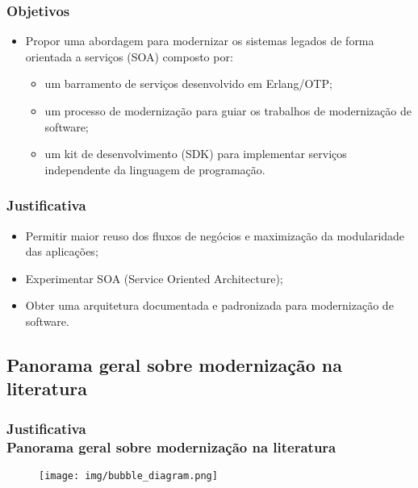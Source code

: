 \documentclass{beamer}
\begin{document}
\begin{frame}
  \frametitle{Objetivos}
  
    \begin{itemize}
       \item<1-> Propor uma abordagem para modernizar os sistemas legados de
forma orientada a serviços (SOA) composto por:

    \begin{itemize}
       \item<1->um barramento de serviços desenvolvido em Erlang/OTP;
       \item<1->um processo de modernização para guiar os trabalhos de modernização de software; 
       \item<1->um kit de desenvolvimento (SDK) para implementar serviços independente da
       linguagem de programação.
    \end{itemize}
				
    \end{itemize}
    
\end{frame}





\begin{frame}
  \frametitle{Justificativa}
  
    \begin{itemize}
       \item<1-> Permitir maior reuso dos fluxos de negócios e maximização da
modularidade das aplicações;
       \item<1-> Experimentar SOA (Service Oriented Architecture);
       \item<1-> Obter uma arquitetura documentada e padronizada para modernização de software.
				
    \end{itemize}
    
\end{frame}


\subsection{Panorama geral sobre modernização na literatura}


\begin{frame}
  \frametitle{Justificativa \\ \small{Panorama geral sobre modernização na literatura}}

  	
	\begin{figure}
	\centering
		\texttt{[image: img/bubble\_diagram.png]}
	\end{figure}
  
\end{frame}
\end{document}
